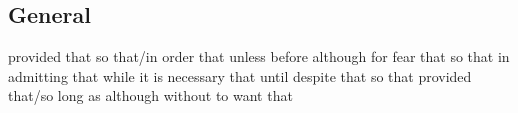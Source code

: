 \subsection*{General}
   {provided that}
   {so that/in order that}
   {unless}   
   {before}
   {although}
   {for fear that}
   {so that}
   {in admitting that}
   {while}
   {it is necessary that}
   {until}
   {despite that}
   {so that}
   {provided that/so long as}
   {although}
   {without}
   {to want that}

